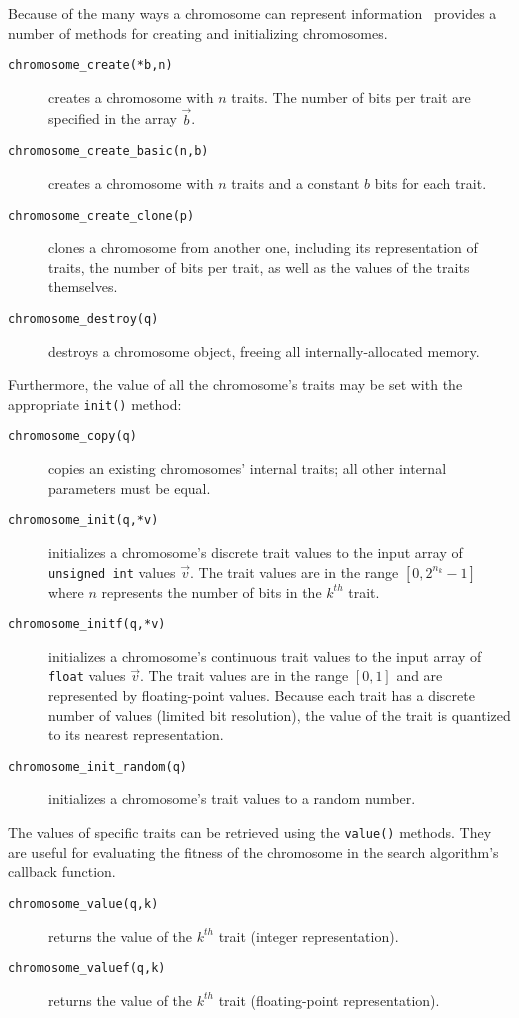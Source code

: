 Because of the many ways a chromosome can represent information \liquid\
provides a number of methods for creating and initializing chromosomes.
%
\begin{description}
\item[{\tt chromosome\_create(*b,n)}]
    creates a chromosome with $n$ traits.
    The number of bits per trait are specified in the array $\vec{b}$.
\item[{\tt chromosome\_create\_basic(n,b)}]
    creates a chromosome with $n$ traits and a constant $b$ bits for
    each trait.
\item[{\tt chromosome\_create\_clone(p)}]
    clones a chromosome from another one, including its representation
    of traits, the number of bits per trait, as well as the values of
    the traits themselves.
\item[{\tt chromosome\_destroy(q)}]
    destroys a chromosome object, freeing all internally-allocated
    memory.
\end{description}
%
Furthermore, the value of all the chromosome's traits may be set with
the appropriate {\tt init()} method:
%
\begin{description}
\item[{\tt chromosome\_copy(q)}]
    copies an existing chromosomes' internal traits; all other internal
    parameters must be equal.
\item[{\tt chromosome\_init(q,*v)}]
    initializes a chromosome's discrete trait values to the input array
    of {\tt unsigned int} values $\vec{v}$.
    The trait values are in the range $[0,2^{n_k}-1]$ where $n$
    represents the number of bits in the $k^{th}$ trait.
\item[{\tt chromosome\_initf(q,*v)}]
    initializes a chromosome's continuous trait values to the input
    array of {\tt float} values $\vec{v}$.
    The trait values are in the range $[0,1]$ and are represented by
    floating-point values.
    Because each trait has a discrete number of values (limited bit
    resolution), the value of the trait is quantized to its nearest
    representation.
\item[{\tt chromosome\_init\_random(q)}]
    initializes a chromosome's trait values to a random number.
\end{description}
%
The values of specific traits can be retrieved using the {\tt value()}
methods.
They are useful for evaluating the fitness of the chromosome in the
search algorithm's callback function.
%
\begin{description}
\item[{\tt chromosome\_value(q,k)}]
    returns the value of the $k^{th}$ trait (integer representation).
\item[{\tt chromosome\_valuef(q,k)}]
    returns the value of the $k^{th}$ trait (floating-point representation).
\end{description}
